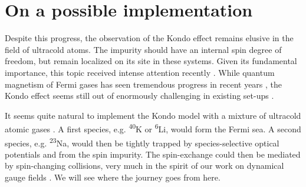 \documentclass[10pt]{article}
\let\cite\citep
\providecommand\citep{\cite}
\begin{document}
\section{On a possible implementation}
Despite this progress, the observation of the Kondo effect remains elusive in the field of ultracold atoms. The impurity should have an internal spin degree of freedom, but remain localized on its site in these systems. Given its fundamental importance, this topic received intense attention recently \cite{Bauer_2013,Nishida_2013,Kuzmenko_2015,Sundar_2016,Gorshkov_2010}. While quantum magnetism of Fermi gases has seen tremendous progress in recent years \cite{Mazurenko_2017}, the Kondo effect seems still out of enormously challenging in existing set-ups \cite{fölling2017}.

It seems quite natural to implement the Kondo model with a mixture of ultracold atomic gases \cite{Kuzmenko_2015}. A first species, e.g. \textsuperscript{40}K or \textsuperscript{6}Li, would form the Fermi sea. A second species, e.g. \textsuperscript{23}Na, would then be tightly trapped by species-selective optical potentials and from the spin impurity. The spin-exchange could then be mediated by spin-changing collisions, very much in the spirit of our work on dynamical gauge fields \cite{Kasper_2016,Kasper_2017,Jendrzejewski}. We will see where the journey goes from here.

\FloatBarrier


\end{document}
